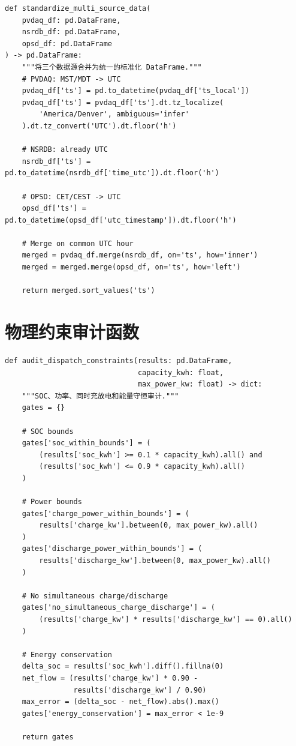 \documentclass[12pt,a4paper]{ctexbook}
\begin{document}
\begin{lstlisting}[caption={多源数据时间标准化}, label={lst:appendix-1}]
def standardize_multi_source_data(
    pvdaq_df: pd.DataFrame,
    nsrdb_df: pd.DataFrame,
    opsd_df: pd.DataFrame
) -> pd.DataFrame:
    """将三个数据源合并为统一的标准化 DataFrame."""
    # PVDAQ: MST/MDT -> UTC
    pvdaq_df['ts'] = pd.to_datetime(pvdaq_df['ts_local'])
    pvdaq_df['ts'] = pvdaq_df['ts'].dt.tz_localize(
        'America/Denver', ambiguous='infer'
    ).dt.tz_convert('UTC').dt.floor('h')

    # NSRDB: already UTC
    nsrdb_df['ts'] = pd.to_datetime(nsrdb_df['time_utc']).dt.floor('h')

    # OPSD: CET/CEST -> UTC
    opsd_df['ts'] = pd.to_datetime(opsd_df['utc_timestamp']).dt.floor('h')

    # Merge on common UTC hour
    merged = pvdaq_df.merge(nsrdb_df, on='ts', how='inner')
    merged = merged.merge(opsd_df, on='ts', how='left')

    return merged.sort_values('ts')
\end{lstlisting}

\section{物理约束审计函数}

\begin{lstlisting}[caption={调度物理约束审计}, label={lst:appendix-2}]
def audit_dispatch_constraints(results: pd.DataFrame,
                               capacity_kwh: float,
                               max_power_kw: float) -> dict:
    """SOC、功率、同时充放电和能量守恒审计."""
    gates = {}

    # SOC bounds
    gates['soc_within_bounds'] = (
        (results['soc_kwh'] >= 0.1 * capacity_kwh).all() and
        (results['soc_kwh'] <= 0.9 * capacity_kwh).all()
    )

    # Power bounds
    gates['charge_power_within_bounds'] = (
        results['charge_kw'].between(0, max_power_kw).all()
    )
    gates['discharge_power_within_bounds'] = (
        results['discharge_kw'].between(0, max_power_kw).all()
    )

    # No simultaneous charge/discharge
    gates['no_simultaneous_charge_discharge'] = (
        (results['charge_kw'] * results['discharge_kw'] == 0).all()
    )

    # Energy conservation
    delta_soc = results['soc_kwh'].diff().fillna(0)
    net_flow = (results['charge_kw'] * 0.90 -
                results['discharge_kw'] / 0.90)
    max_error = (delta_soc - net_flow).abs().max()
    gates['energy_conservation'] = max_error < 1e-9

    return gates
\end{lstlisting}
\end{document}
